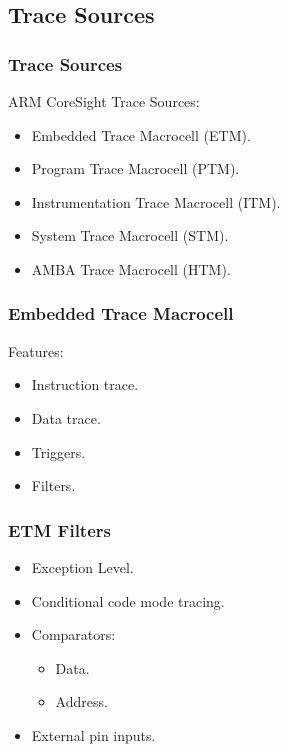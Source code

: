 \documentclass{beamer}
\begin{document}
\subsection{Trace Sources}
\begin{frame}
    \frametitle{Trace Sources}
    ARM CoreSight Trace Sources:
    \begin{itemize}
        \item Embedded Trace Macrocell (ETM).
        \item Program Trace Macrocell (PTM).
        \item Instrumentation Trace Macrocell (ITM).
        \item System Trace Macrocell (STM).
        \item AMBA Trace Macrocell (HTM).
    \end{itemize}
\end{frame}
\begin{frame}
    \frametitle{Embedded Trace Macrocell}
    Features:
    \begin{itemize}
        \item Instruction trace.
        \item Data trace.
        \item Triggers.
        \item Filters.
    \end{itemize}
\end{frame}

\begin{frame}
    \frametitle{ETM Filters}
    \begin{itemize}
        \item Exception Level.
        \item Conditional code mode tracing.
        \item Comparators:
            \begin{itemize}
                \item Data.
                \item Address.
            \end{itemize}
        \item External pin inputs.
    \end{itemize}
\end{frame}
\end{document}
